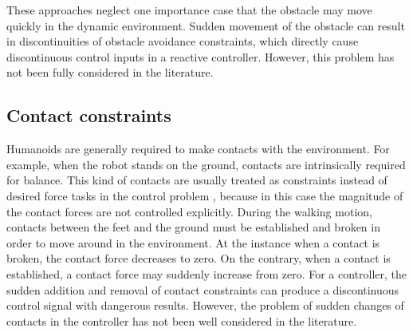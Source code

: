 These approaches neglect one importance case that the obstacle may move quickly in the dynamic environment. Sudden movement of the obstacle can result in discontinuities of obstacle avoidance constraints, which directly cause discontinuous control inputs in a reactive controller. However, this problem has not been fully considered in the literature. 



\subsection{Contact constraints}
Humanoids are generally required to make contacts with the environment. For example, when the robot stands on the ground, contacts are intrinsically required for balance. This kind of contacts are usually treated as constraints instead of desired force tasks in the control problem \cite{abe2007,wensing2013,herzog2014}, because in this case the magnitude of the contact forces are not controlled explicitly. During the walking motion, contacts between the feet and the ground must be established and broken in order to move around in the environment. At the instance when a contact is broken, the contact force decreases to zero. On the contrary, when a contact is established, a contact force may suddenly increase from zero. For a controller, the sudden addition and removal of contact constraints can produce a discontinuous control signal with dangerous results. However, the problem of sudden changes of contacts in the controller has not been well considered in the literature.

